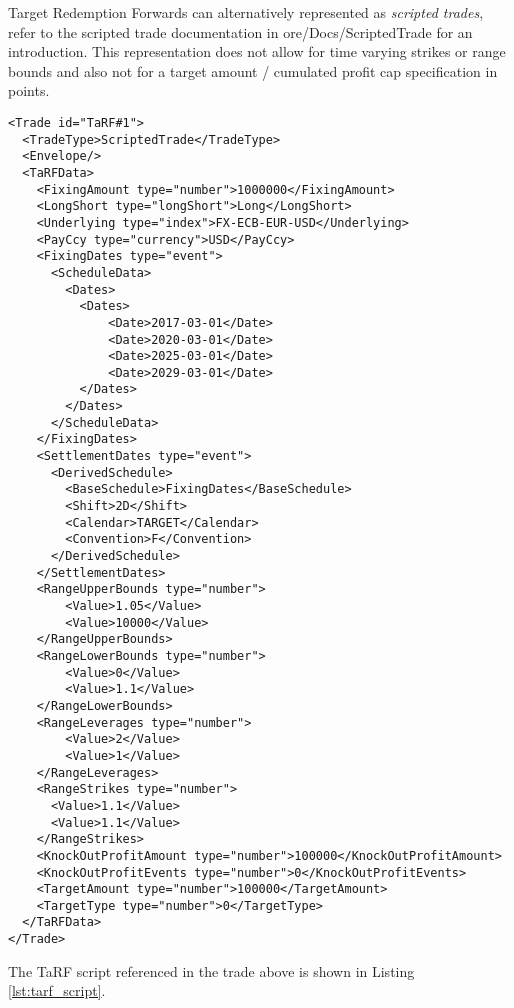 
Target Redemption Forwards can alternatively represented as {\em scripted trades},
refer to the scripted trade documentation in ore/Docs/ScriptedTrade
for an introduction. This representation does not allow for time varying strikes or range
bounds and also not for a target amount / cumulated profit cap specification in points.

\begin{verbatim}
<Trade id="TaRF#1">
  <TradeType>ScriptedTrade</TradeType>
  <Envelope/>
  <TaRFData>
    <FixingAmount type="number">1000000</FixingAmount>
    <LongShort type="longShort">Long</LongShort>
    <Underlying type="index">FX-ECB-EUR-USD</Underlying>
    <PayCcy type="currency">USD</PayCcy>
    <FixingDates type="event">
      <ScheduleData>
        <Dates>
          <Dates>
              <Date>2017-03-01</Date>
              <Date>2020-03-01</Date>
              <Date>2025-03-01</Date>
              <Date>2029-03-01</Date>
          </Dates>
        </Dates>
      </ScheduleData>
    </FixingDates>
    <SettlementDates type="event">
      <DerivedSchedule>
        <BaseSchedule>FixingDates</BaseSchedule>
        <Shift>2D</Shift>
        <Calendar>TARGET</Calendar>
        <Convention>F</Convention>
      </DerivedSchedule>
    </SettlementDates>
    <RangeUpperBounds type="number">
        <Value>1.05</Value>
        <Value>10000</Value>
    </RangeUpperBounds>
    <RangeLowerBounds type="number">
        <Value>0</Value>
        <Value>1.1</Value>
    </RangeLowerBounds>
    <RangeLeverages type="number">
        <Value>2</Value>
        <Value>1</Value>
    </RangeLeverages>
    <RangeStrikes type="number">
      <Value>1.1</Value>
      <Value>1.1</Value>
    </RangeStrikes>
    <KnockOutProfitAmount type="number">100000</KnockOutProfitAmount>
    <KnockOutProfitEvents type="number">0</KnockOutProfitEvents>
    <TargetAmount type="number">100000</TargetAmount>
    <TargetType type="number">0</TargetType>
  </TaRFData>
</Trade>
\end{verbatim}

The TaRF script referenced in the trade above is shown in Listing \ref{lst:tarf_script}.

